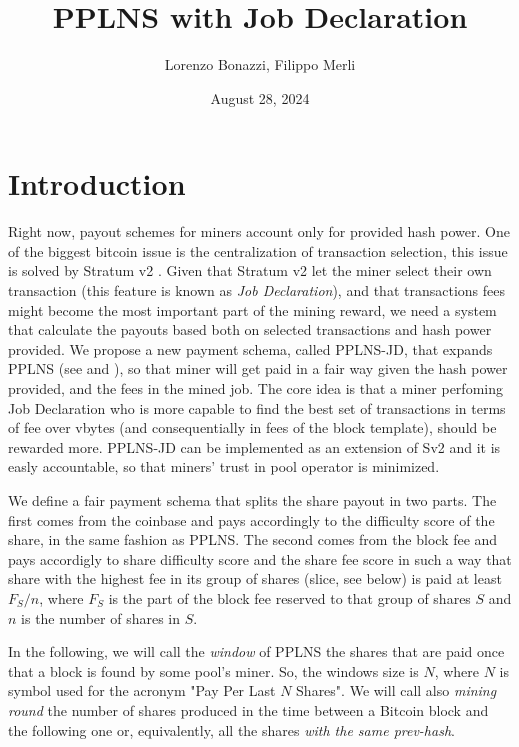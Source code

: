 \documentclass[11pt]{article}
\title{PPLNS with Job Declaration}
\author{Lorenzo Bonazzi, Filippo Merli}
\date{August 28, 2024} %
\begin{document}
\maketitle

\section{Introduction}

Right now, payout schemes for miners account only for provided hash power.
One of the biggest bitcoin issue is the centralization of transaction selection, this issue is solved by Stratum v2 \cite{sv2}. Given that Stratum v2 let the miner select their own transaction (this feature is known as \emph{Job Declaration}), and that transactions fees might become the most important part of the mining reward, we need a system that calculate the payouts based both on selected transactions and hash power provided. We propose a new payment schema, called PPLNS-JD, that expands PPLNS (see \cite{rosenfeld} and \cite{ocean}), so that miner will get paid in a fair way given the hash power provided, and the fees in the mined job. The core idea is that a miner perfoming Job Declaration who is more capable to find the best set of transactions in terms of fee over vbytes (and consequentially in fees of the block template), should be rewarded more. PPLNS-JD can be implemented as an extension of Sv2 \cite{extension} and it is easly accountable, so that miners' trust in pool operator is minimized. 

We define a fair payment schema that splits the share payout in two parts. The first comes from the coinbase and pays accordingly to the difficulty score of the share, in the same fashion as PPLNS. The second comes from the block fee and pays accordigly to share difficulty score and the share fee score in such a way that share with the highest fee in its group of shares (slice, see below) is paid at least $F_S/n$, where $F_S$ is the part of the block fee reserved to that group of shares $S$ and $n$ is the number of shares in $S$.

In the following, we will call the \emph{window} of PPLNS the shares that are paid once that a block is found by some pool's miner. So, the windows size is $N$, where $N$ is symbol used for the acronym "Pay Per Last $N$ Shares". We will call also \emph{mining round} the number of shares produced in the time between a Bitcoin block and the following one or, equivalently, all the shares \emph{with the same prev-hash}.
\end{document}
